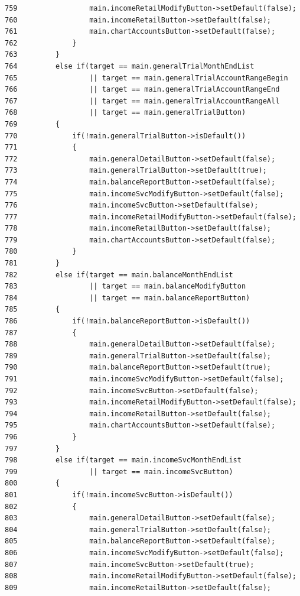 \begin{verbatim}
759                 main.incomeRetailModifyButton->setDefault(false);
760                 main.incomeRetailButton->setDefault(false);
761                 main.chartAccountsButton->setDefault(false);
762             }
763         }
764         else if(target == main.generalTrialMonthEndList
765                 || target == main.generalTrialAccountRangeBegin
766                 || target == main.generalTrialAccountRangeEnd
767                 || target == main.generalTrialAccountRangeAll
768                 || target == main.generalTrialButton)
769         {
770             if(!main.generalTrialButton->isDefault())
771             {
772                 main.generalDetailButton->setDefault(false);
773                 main.generalTrialButton->setDefault(true);
774                 main.balanceReportButton->setDefault(false);
775                 main.incomeSvcModifyButton->setDefault(false);
776                 main.incomeSvcButton->setDefault(false);
777                 main.incomeRetailModifyButton->setDefault(false);
778                 main.incomeRetailButton->setDefault(false);
779                 main.chartAccountsButton->setDefault(false);
780             }
781         }
782         else if(target == main.balanceMonthEndList
783                 || target == main.balanceModifyButton   
784                 || target == main.balanceReportButton)
785         {
786             if(!main.balanceReportButton->isDefault())
787             {
788                 main.generalDetailButton->setDefault(false);
789                 main.generalTrialButton->setDefault(false);
790                 main.balanceReportButton->setDefault(true);
791                 main.incomeSvcModifyButton->setDefault(false);
792                 main.incomeSvcButton->setDefault(false);
793                 main.incomeRetailModifyButton->setDefault(false);
794                 main.incomeRetailButton->setDefault(false);
795                 main.chartAccountsButton->setDefault(false);
796             }
797         }
798         else if(target == main.incomeSvcMonthEndList
799                 || target == main.incomeSvcButton)
800         {
801             if(!main.incomeSvcButton->isDefault())
802             {
803                 main.generalDetailButton->setDefault(false);
804                 main.generalTrialButton->setDefault(false);
805                 main.balanceReportButton->setDefault(false);
806                 main.incomeSvcModifyButton->setDefault(false);
807                 main.incomeSvcButton->setDefault(true);
808                 main.incomeRetailModifyButton->setDefault(false);
809                 main.incomeRetailButton->setDefault(false);

\end{verbatim}
